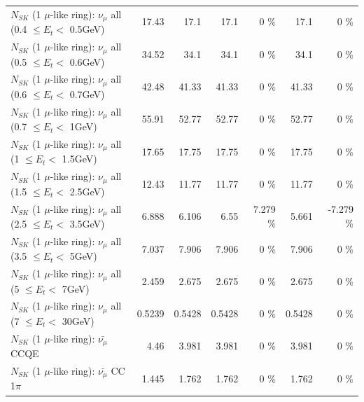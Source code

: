 \begin{table}
\begin{tabular}{| l | r | r | r  r | r  r |}
       $N_{SK}$ (1 $\mu$-like ring): $\nu_{\mu}$ all (0.4 $\leq E_{t} <$ 0.5GeV) &           17.43 &            17.1 &            17.1 &        0 \%  &            17.1 &        0 \%  \\ 
       $N_{SK}$ (1 $\mu$-like ring): $\nu_{\mu}$ all (0.5 $\leq E_{t} <$ 0.6GeV) &           34.52 &            34.1 &            34.1 &        0 \%  &            34.1 &        0 \%  \\ 
       $N_{SK}$ (1 $\mu$-like ring): $\nu_{\mu}$ all (0.6 $\leq E_{t} <$ 0.7GeV) &           42.48 &           41.33 &           41.33 &        0 \%  &           41.33 &        0 \%  \\ 
         $N_{SK}$ (1 $\mu$-like ring): $\nu_{\mu}$ all (0.7 $\leq E_{t} <$ 1GeV) &           55.91 &           52.77 &           52.77 &        0 \%  &           52.77 &        0 \%  \\ 
         $N_{SK}$ (1 $\mu$-like ring): $\nu_{\mu}$ all (1 $\leq E_{t} <$ 1.5GeV) &           17.65 &           17.75 &           17.75 &        0 \%  &           17.75 &        0 \%  \\ 
       $N_{SK}$ (1 $\mu$-like ring): $\nu_{\mu}$ all (1.5 $\leq E_{t} <$ 2.5GeV) &           12.43 &           11.77 &           11.77 &        0 \%  &           11.77 &        0 \%  \\ 
       $N_{SK}$ (1 $\mu$-like ring): $\nu_{\mu}$ all (2.5 $\leq E_{t} <$ 3.5GeV) &           6.888 &           6.106 &            6.55 &    7.279 \%  &           5.661 &   -7.279 \%  \\ 
         $N_{SK}$ (1 $\mu$-like ring): $\nu_{\mu}$ all (3.5 $\leq E_{t} <$ 5GeV) &           7.037 &           7.906 &           7.906 &        0 \%  &           7.906 &        0 \%  \\ 
           $N_{SK}$ (1 $\mu$-like ring): $\nu_{\mu}$ all (5 $\leq E_{t} <$ 7GeV) &           2.459 &           2.675 &           2.675 &        0 \%  &           2.675 &        0 \%  \\ 
          $N_{SK}$ (1 $\mu$-like ring): $\nu_{\mu}$ all (7 $\leq E_{t} <$ 30GeV) &          0.5239 &          0.5428 &          0.5428 &        0 \%  &          0.5428 &        0 \%  \\ 
\hline
\hline
\hline
                              $N_{SK}$ (1 $\mu$-like ring): $\bar{\nu_\mu}$ CCQE &            4.46 &           3.981 &           3.981 &        0 \%  &           3.981 &        0 \%  \\ 
                         $N_{SK}$ (1 $\mu$-like ring): $\bar{\nu_\mu}$ CC 1$\pi$ &           1.445 &           1.762 &           1.762 &        0 \%  &           1.762 &        0 \%  \\ 

\end{tabular}
\end{table}
